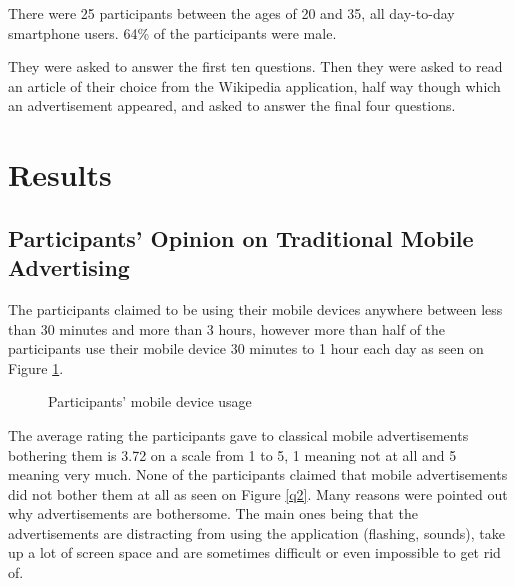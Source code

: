 There were 25 participants between the ages of 20 and 35, all day-to-day smartphone users. 64\% of the participants were male.

They were asked to answer the first ten questions. Then they were asked to read an article of their choice from the Wikipedia application, half way though which an advertisement appeared, and asked to answer the final four questions.

\section{Results}

\subsection{Participants' Opinion on Traditional Mobile Advertising}

The participants claimed to be using their mobile devices anywhere between less than 30 minutes and more than 3 hours, however more than half of the participants use their mobile device 30 minutes to 1 hour each day as seen on Figure \ref{q1}.

\begin{figure}
\begin{center}
\caption{Participants' mobile device usage}
\label{q1}
\end{center}
\end{figure}

The average rating the participants gave to classical mobile advertisements bothering them is 3.72 on a scale from 1 to 5, 1 meaning not at all and 5 meaning very much. None of the participants claimed that mobile advertisements did not bother them at all as seen on Figure \ref{q2}. Many reasons were pointed out why advertisements are bothersome. The main ones being that the advertisements are distracting from using the application (flashing, sounds), take up a lot of screen space and are sometimes difficult or even impossible to get rid of.

